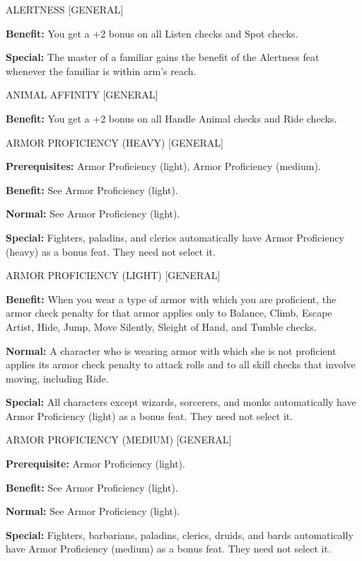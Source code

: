 \documentclass{article}
\begin{document}
\vspace{12pt}
ALERTNESS [GENERAL]

\textbf{Benefit:} You get a +2 bonus on all Listen checks and Spot checks.

\textbf{Special: }The master of a familiar gains the benefit of the Alertness feat 
whenever the familiar is within arm's reach.

\vspace{12pt}
ANIMAL AFFINITY [GENERAL]

\textbf{Benefit:} You get a +2 bonus on all Handle Animal checks and Ride checks.

\vspace{12pt}
ARMOR PROFICIENCY (HEAVY) [GENERAL]

\textbf{Prerequisites:} Armor Proficiency (light), Armor Proficiency (medium).

\textbf{Benefit:} See Armor Proficiency (light).

\textbf{Normal:} See Armor Proficiency (light).

\textbf{Special:} Fighters, paladins, and clerics automatically have Armor Proficiency 
(heavy) as a bonus feat. They need not select it.

\vspace{12pt}
ARMOR PROFICIENCY (LIGHT) [GENERAL]

\textbf{Benefit:} When you wear a type of armor with which you are proficient, 
the armor check penalty for that armor applies only to Balance, Climb, Escape Artist, 
Hide, Jump, Move Silently, Sleight of Hand, and Tumble checks.

\textbf{Normal:} A character who is wearing armor with which she is not proficient 
applies its armor check penalty to attack rolls and to all skill checks that involve 
moving, including Ride.

\textbf{Special:} All characters except wizards, sorcerers, and monks automatically 
have Armor Proficiency (light) as a bonus feat. They need not select it.

\vspace{12pt}
ARMOR PROFICIENCY (MEDIUM) [GENERAL]

\textbf{Prerequisite:} Armor Proficiency (light).

\textbf{Benefit:} See Armor Proficiency (light).

\textbf{Normal:} See Armor Proficiency (light).

\textbf{Special:} Fighters, barbarians, paladins, clerics, druids, and bards automatically 
have Armor Proficiency (medium) as a bonus feat. They need not select it.
\end{document}
